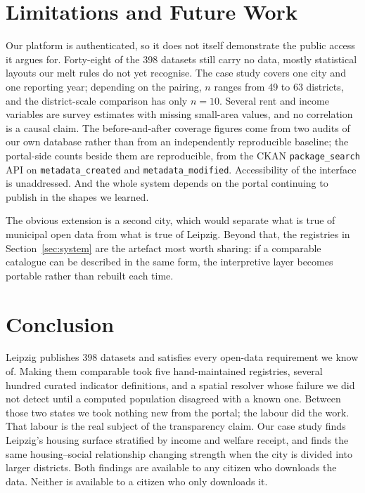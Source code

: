\documentclass[conference,a4paper]{IEEEtran}
\begin{document}
\section{Limitations and Future Work}

Our platform is authenticated, so it does not itself demonstrate the public
access it argues for. Forty-eight of the 398 datasets still carry no data, mostly
statistical layouts our melt rules do not yet recognise. The case study covers
one city and one reporting year; depending on the pairing, $n$ ranges from 49 to
63 districts, and the district-scale comparison has only $n=10$. Several rent
and income variables are survey estimates with missing small-area values, and no
correlation is a causal claim. The before-and-after coverage figures come from
two audits of our own database rather than from an independently reproducible
baseline; the portal-side counts beside them are reproducible, from the CKAN
\texttt{package\_search} API on \texttt{metadata\_created} and
\texttt{metadata\_modified}. Accessibility of the interface is unaddressed. And
the whole system depends on the portal continuing to publish in the shapes we
learned.

The obvious extension is a second city, which would separate what is true of
municipal open data from what is true of Leipzig. Beyond that, the registries in
Section~\ref{sec:system} are the artefact most worth sharing: if a comparable catalogue can be
described in the same form, the interpretive layer becomes portable rather than
rebuilt each time.

\section{Conclusion}

Leipzig publishes 398 datasets and satisfies every open-data requirement we know
of. Making them comparable took five hand-maintained registries, several hundred
curated indicator definitions, and a spatial resolver whose failure we did not
detect until a computed population disagreed with a known one. Between those two
states we took nothing new from the portal; the labour did the work. That labour
is the real subject of the transparency claim. Our case study finds Leipzig's housing
surface stratified by income and welfare receipt, and finds the same
housing--social relationship changing strength when the city is divided into
larger districts. Both findings are available to any citizen who downloads the
data. Neither is available to a citizen who only downloads it.



\end{document}
